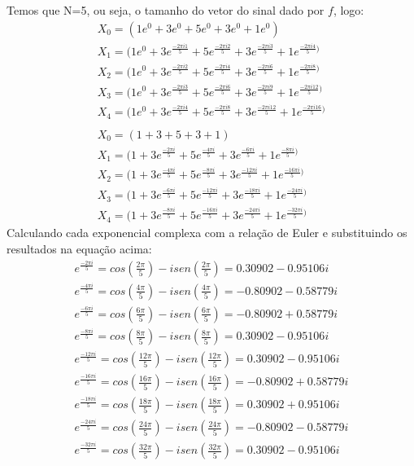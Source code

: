 \documentclass[12pt]{article}
\begin{document}
\begin{itemize}
\begin{itemize}
Temos que N=5, ou seja, o tamanho do vetor do sinal dado por $f$, logo:
\begin{align*}
    &X_0 = (1e^0 + 3e^0 + 5e^0 + 3e^0 + 1e^0) &\\
    &X_1 = (1e^0 + 3e^{\frac{-2\pi i1}{5}} + 5e^{\frac{-2\pi i2}{5}} + 3e^{\frac{-2\pi i3}{5}} + 1e^{\frac{-2\pi i4}{5})} &\\
    &X_2 = (1e^0 + 3e^{\frac{-2\pi i2}{5}} + 5e^{\frac{-2\pi i4}{5}} + 3e^{\frac{-2\pi i6}{5}} + 1e^{\frac{-2\pi i8}{5})} &\\
    &X_3 = (1e^0 + 3e^{\frac{-2\pi i3}{5}} + 5e^{\frac{-2\pi i6}{5}} + 3e^{\frac{-2\pi i9}{5}} + 1e^{\frac{-2\pi i12}{5})} &\\
    &X_4 = (1e^0 + 3e^{\frac{-2\pi i4}{5}} + 5e^{\frac{-2\pi i8}{5}} + 3e^{\frac{-2\pi i12}{5}} + 1e^{\frac{-2\pi i16}{5})} &\\
    \\&X_0 = (1 + 3 + 5 + 3 + 1) &\\
    &X_1 = (1 + 3e^{\frac{-2\pi i}{5}} + 5e^{\frac{-4\pi i}{5}}  + 3e^{\frac{-6\pi i}{5}}  + 1e^{\frac{-8\pi i}{5})} &\\
    &X_2 = (1 + 3e^{\frac{-4\pi i}{5}} + 5e^{\frac{-8\pi i}{5}}  + 3e^{\frac{-12\pi i}{5}} + 1e^{\frac{-16\pi i}{5})} &\\
    &X_3 = (1 + 3e^{\frac{-6\pi i}{5}} + 5e^{\frac{-12\pi i}{5}} + 3e^{\frac{-18\pi i}{5}} + 1e^{\frac{-24\pi i}{5})} &\\
    &X_4 = (1 + 3e^{\frac{-8\pi i}{5}} + 5e^{\frac{-16\pi i}{5}} + 3e^{\frac{-24\pi i}{5}} + 1e^{\frac{-32\pi i}{5})}&
\end{align*}
Calculando cada exponencial complexa com a relação de Euler e substituindo os resultados na equação acima:
\begin{align*}
    &e^{\frac{-2\pi i}{5}} = cos(\frac{2\pi}{5}) - isen(\frac{2\pi}{5}) = 0.30902  - 0.95106i &\\
    &e^{\frac{-4\pi i}{5}} = cos(\frac{4\pi}{5}) - isen(\frac{4\pi}{5}) = -0.80902 - 0.58779i &\\
    &e^{\frac{-6\pi i}{5}} = cos(\frac{6\pi}{5}) - isen(\frac{6\pi}{5}) = -0.80902 + 0.58779i &\\
    &e^{\frac{-8\pi i}{5}} = cos(\frac{8\pi}{5}) - isen(\frac{8\pi}{5}) = 0.30902  - 0.95106i &\\
    &e^{\frac{-12\pi i}{5}} = cos(\frac{12\pi}{5}) - isen(\frac{12\pi}{5}) = 0.30902	-0.95106i &\\
    &e^{\frac{-16\pi i}{5}} = cos(\frac{16\pi}{5}) - isen(\frac{16\pi}{5}) = -0.80902 + 0.58779i &\\
    &e^{\frac{-18\pi i}{5}} = cos(\frac{18\pi}{5}) - isen(\frac{18\pi}{5}) = 0.30902 + 0.95106i &\\
    &e^{\frac{-24\pi i}{5}} = cos(\frac{24\pi}{5}) - isen(\frac{24\pi}{5}) = -0.80902 - 0.58779i &\\
    &e^{\frac{-32\pi i}{5}} = cos(\frac{32\pi}{5}) - isen(\frac{32\pi}{5}) = 0.30902	- 0.95106i&
\end{align*}


\end{itemize}
\end{itemize}
\end{document}
